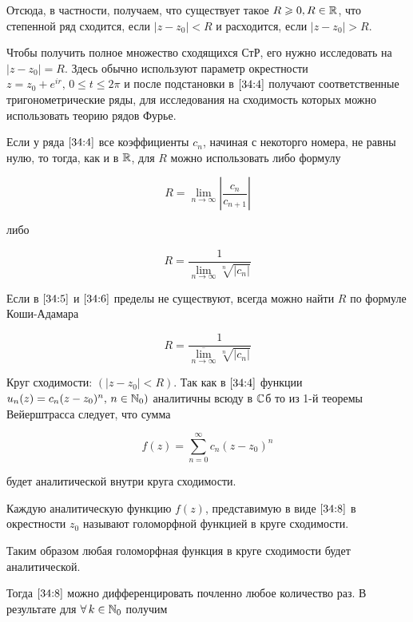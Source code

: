 \documentclass[../../main.tex]{subfiles}
\begin{document}
Отсюда, в частности, получаем, что существует такое $ R \geqslant 0, R \in \mathbb{R} $, 
что степенной ряд сходится, если $ |z - z_0| < R $ и расходится, если $ |z - 
z_0| > R $.

Чтобы получить полное множество сходящихся СтР, его нужно исследовать на $ |z 
- z_0| = R $. Здесь обычно используют параметр окрестности $ z = z_0 + 
e^{ir},\, 0 \leq t \leq 2\pi $ и после подстановки в $ \eqref{34:4} $ получают 
соответственные тригонометрические ряды, для исследования на сходимость 
которых можно использовать теорию рядов Фурье.

Если у ряда $ \eqref{34:4} $ все коэффициенты $ c_n $, начиная с некоторго 
номера, не равны нулю, то тогда, как и в $ \mathbb{R} $, для $R$ можно использовать 
либо формулу

\begin{equation}\label{34:5}
	R = \underset{n \to \infty}{\lim} |\frac{c_n}{c_{n+1}}|
\end{equation}

либо

\begin{equation}\label{34:6}
	R = \frac{1}{\underset{n \to \infty}{\lim} \sqrt[n]{|c_n|}}
\end{equation}

Если в $ \eqref{34:5} $ и $ \eqref{34:6} $ пределы не существуют, всегда можно 
найти $R$ по формуле Коши-Адамара

\begin{equation}\label{34:7}
	R = \frac{1}{\overline{\underset{n \to \infty}{\lim}} \sqrt[n]{|c_n|}}
\end{equation}

Круг сходимости: $ (|z - z_0| < R) $. Так как в $ \eqref{34:4} $ функции $ 
u_n(z) = c_n(z - z_0)^n,\, n \in \mathbb{N}_0) $ аналитичны всюду в $ \mathbb{C} $б то из 1-й 
теоремы Вейерштрасса следует, что сумма

\begin{equation}\label{34:8}
	f(z) = \sum\limits_{n = 0}^{\infty} c_n(z - z_0)^n
\end{equation}

будет аналитической внутри круга сходимости.

Каждую аналитическую функцию $ f(z) $, представимую в виде $ \eqref{34:8} $ в 
окрестности $z_0$ называют голоморфной функцией в круге сходимости.

Таким образом любая голоморфная функция в круге сходимости будет аналитической.

Тогда $ \eqref{34:8} $ можно дифференцировать почленно любое количество раз. В 
результате для $ \forall\, k \in \mathbb{N}_0 $ получим
\end{document}
